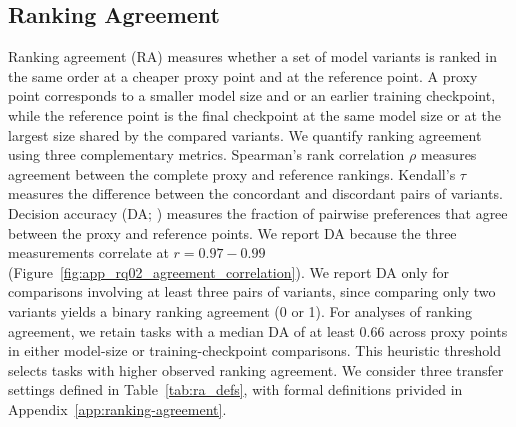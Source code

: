 





\subsection{Ranking Agreement}
\label{subsec:methodology-da}

Ranking agreement (RA) measures whether a set of model variants is ranked in the same order at a cheaper proxy point and at the reference point. 
A proxy point corresponds to a smaller model size and or an earlier training checkpoint, while the reference point is the final checkpoint at the same model size or at the largest size shared by the compared variants.
We quantify ranking agreement using three complementary metrics. Spearman's rank correlation $\rho$ measures agreement between the complete proxy and reference rankings.
Kendall's $\tau$ measures the difference between the concordant and discordant pairs of variants.
Decision accuracy (DA; \citealp{heineman_signal_2025}) measures the fraction of pairwise preferences that agree between the proxy and reference points.
We report DA because the three measurements correlate at $r=0.97-0.99$ (Figure~\ref{fig:app_rq02_agreement_correlation}).
We report DA only for comparisons involving at least three pairs of variants, since comparing only two variants yields a binary ranking agreement (0 or 1).
For analyses of ranking agreement, we retain tasks with a median DA of at least 0.66 across proxy points in either model-size or training-checkpoint comparisons. This heuristic threshold selects tasks with higher observed ranking agreement.
We consider three transfer settings defined in Table~\ref{tab:ra_defs}, with formal definitions privided in Appendix~\ref{app:ranking-agreement}.

